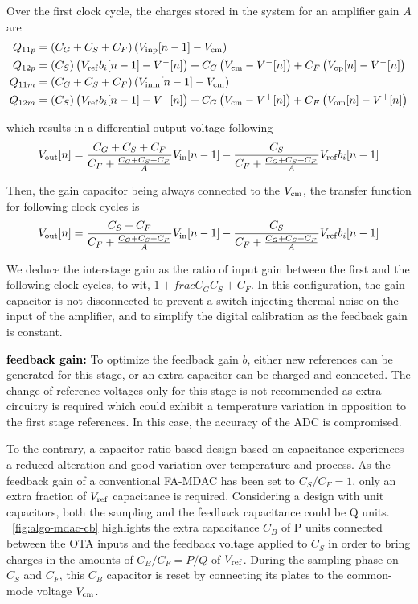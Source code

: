 Over the first clock cycle, the charges stored in the system for an amplifier gain $A$ are
\begin{align}
Q_{11p} &= \left(C_G+C_S+C_F \right) \left( V_{\rm inp}[n-1] - V_{\rm cm} \right)\\
Q_{12p} &= \left(C_S \right) \left( V_{\rm ref}b_i[n-1] - V^{-}[n] \right) + C_G \left(V_{\rm cm}-V^{-}[n] \right)  + C_F \left(V_{\rm op}[n]-V^{-}[n] \right) \\
Q_{11m} &= \left(C_G+C_S+C_F \right) \left( V_{\rm inm}[n-1] - V_{\rm cm} \right) \\
Q_{12m} &= \left(C_S \right) \left( V_{\rm ref}b_i[n-1] - V^{+}[n] \right) + C_G \left(V_{\rm cm}-V^{+}[n] \right)  + C_F \left(V_{\rm om}[n]-V^{+}[n] \right)
\end{align}

which results in a differential output voltage following 
\begin{equation}
	V_{\rm out}[n] = \frac{C_G+C_S+C_F}{C_F+\frac{C_G+C_S+C_F}{A}} V_{\rm in}[n-1] - \frac{C_S}{C_F+\frac{C_G+C_S+C_F}{A}} V_{\rm ref}b_i[n-1]
\end{equation}

Then, the gain capacitor being always connected to the $V_{\rm cm}$, the transfer function for following clock cycles is 
\begin{equation}
	V_{\rm out}[n] = \frac{C_S+C_F}{C_F+\frac{C_G+C_S+C_F}{A}} V_{\rm in}[n-1] - \frac{C_S}{C_F+\frac{C_G+C_S+C_F}{A}} V_{\rm ref}b_i[n-1]
\end{equation}

We deduce the interstage gain as the ratio of input gain between the first and the following clock cycles, to wit, $1+frac{C_G}{C_S+C_F}$.  In this configuration, the gain capacitor is not disconnected to prevent a switch injecting thermal noise on the input of the amplifier, and to simplify the digital calibration as the feedback gain is constant.

\textbf{\textcolor{black}{feedback gain:}}
To optimize the feedback gain $b$, either new references can be generated for this stage, or an extra capacitor can be charged and connected. The change of reference voltages only for this stage is not recommended as extra circuitry is required which could exhibit a temperature variation in opposition to the first stage references. In this case, the accuracy of the ADC is compromised.

To the contrary, a capacitor ratio based design based on capacitance experiences a reduced alteration and good variation over temperature and process. As the feedback gain of a conventional FA-MDAC has been set to \(C_S/C_F = 1\), only an extra fraction of \(V_{\rm ref}\) capacitance is required. Considering a design with unit capacitors, both the sampling and the feedback capacitance could be Q units. \figurename~\ref{fig:algo-mdac-cb} highlights the extra capacitance \(C_B\) of P units connected between the OTA inputs and the feedback voltage applied to \(C_S\) in order to bring charges in the amounts of \(C_B/C_F = P/Q\) of \(V_{\rm ref}\). During the sampling phase on \(C_S\) and \(C_F\), this \(C_B\) capacitor is reset by connecting its plates to the common-mode voltage \(V_{\rm cm}\).

